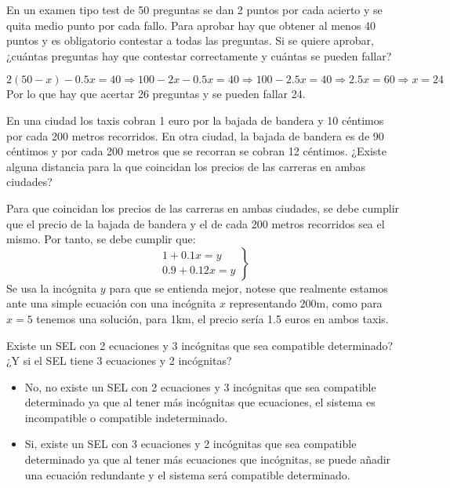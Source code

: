 \begin{ejercicio}En un examen tipo test de 50 preguntas se dan 2 puntos por cada acierto y se quita medio punto por cada fallo. Para aprobar hay que obtener al menos 40 puntos y es obligatorio contestar a todas las preguntas. Si se quiere aprobar, ¿cuántas preguntas hay que contestar correctamente y cuántas se pueden fallar?

	\begin{equation*}
		2(50-x) - 0.5x = 40 \Rightarrow 100 - 2x - 0.5x = 40 \Rightarrow 100 - 2.5x = 40 \Rightarrow 2.5x = 60 \Rightarrow x = 24
	\end{equation*}
	Por lo que hay que acertar 26 preguntas y se pueden fallar 24.
\end{ejercicio}

\begin{ejercicio}En una ciudad los taxis cobran 1 euro por la bajada de bandera y 10 céntimos por cada 200 metros recorridos. En otra ciudad, la bajada de bandera es de 90 céntimos y por cada 200 metros que se recorran se cobran 12 céntimos. ¿Existe alguna distancia para la que coincidan los precios de las carreras en ambas ciudades?

	Para que coincidan los precios de las carreras en ambas ciudades, se debe cumplir que el precio de la bajada de bandera y el de cada 200 metros recorridos sea el mismo. Por tanto, se debe cumplir que:
	\begin{equation*}
		\left.
		\begin{array}{l}
			1 + 0.1x = y \\
			0.9 + 0.12x = y
		\end{array} \right\}
	\end{equation*}
	Se usa la incógnita $y$ para que se entienda mejor, notese que realmente
	estamos ante una simple ecuación con una incógnita $x$ representando $200$m, como para $x=5$ tenemos una solución, para 1km, el precio sería 1.5 euros en ambos
	taxis.

\end{ejercicio}
\begin{ejercicio}Existe un SEL con 2 ecuaciones y 3 incógnitas que sea compatible determinado? ¿Y si el SEL tiene 3 ecuaciones y 2 incógnitas?

	\begin{itemize}
		\item No, no existe un SEL con 2 ecuaciones y 3 incógnitas que sea compatible determinado ya que al tener más incógnitas que ecuaciones, el sistema es incompatible o compatible indeterminado.
		\item Si, existe un SEL con 3 ecuaciones y 2 incógnitas que sea compatible determinado ya que al tener más ecuaciones que incógnitas, se puede añadir una ecuación redundante y el sistema será compatible determinado.
	\end{itemize}

\end{ejercicio}


